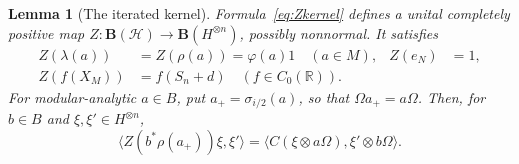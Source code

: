 \documentclass[11pt]{article}
\newtheorem{lemma}[theorem]{Lemma}
\theoremstyle{definition}
\newcommand{\R}{\mathbb R}
\newcommand{\HH}{\mathcal H}
\begin{document}
\begin{lemma}[The iterated kernel]\label{lem:kernel}
Formula~\eqref{eq:Zkernel} defines a unital completely positive map
$Z:\mathbf B(\HH)\to\mathbf B(H^{\otimes n})$, possibly nonnormal. It satisfies
\begin{align}
 Z(\lambda(a))&=Z(\rho(a))=\varphi(a)1\quad(a\in M),
 &Z(e_N)&=1,\label{eq:Zmarg}\\
 Z(f(X_M))&=f(S_n+d)\quad(f\in C_0(\R)).\label{eq:Zspectral}
\end{align}
For modular-analytic $a\in B$, put $a_+=\sigma_{i/2}(a)$, so that
$\Omega a_+=a\Omega$. Then, for $b\in B$ and
$\xi,\xi'\in H^{\otimes n}$,
\begin{equation}\label{eq:Zmixed}
 \langle Z(b^*\rho(a_+))\xi,\xi'\rangle
 =\langle C(\xi\otimes a\Omega),\xi'\otimes b\Omega\rangle.
\end{equation}
\end{lemma}
\end{document}

